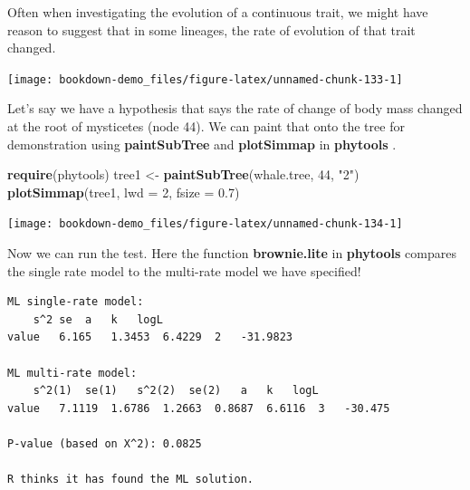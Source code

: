 \documentclass[
]{book}
\newenvironment{Shaded}{\begin{snugshade}}{\end{snugshade}}
\newcommand{\DataTypeTok}[1]{\textcolor[rgb]{0.13,0.29,0.53}{#1}}
\newcommand{\DecValTok}[1]{\textcolor[rgb]{0.00,0.00,0.81}{#1}}
\newcommand{\FloatTok}[1]{\textcolor[rgb]{0.00,0.00,0.81}{#1}}
\newcommand{\KeywordTok}[1]{\textcolor[rgb]{0.13,0.29,0.53}{\textbf{#1}}}
\newcommand{\NormalTok}[1]{#1}
\newcommand{\OperatorTok}[1]{\textcolor[rgb]{0.81,0.36,0.00}{\textbf{#1}}}
\newcommand{\StringTok}[1]{\textcolor[rgb]{0.31,0.60,0.02}{#1}}
\begin{document}
Often when investigating the evolution of a continuous trait, we might have reason to suggest that in some lineages, the rate of evolution of that trait changed.

\begin{center}\texttt{[image: bookdown-demo\_files/figure-latex/unnamed-chunk-133-1]} \end{center}

Let's say we have a hypothesis that says the rate of change of body mass changed at the root of mysticetes (node 44). We can paint that onto the tree for demonstration using \textbf{paintSubTree} and \textbf{plotSimmap} in \textbf{phytools} \citep{phytools}.

\begin{Shaded}
\begin{Highlighting}[]
\KeywordTok{require}\NormalTok{(phytools)}
\NormalTok{tree1 \textless{}{-}}\StringTok{ }\KeywordTok{paintSubTree}\NormalTok{(whale.tree, }\DecValTok{44}\NormalTok{, }\StringTok{"2"}\NormalTok{)}
\KeywordTok{plotSimmap}\NormalTok{(tree1, }\DataTypeTok{lwd =} \DecValTok{2}\NormalTok{, }\DataTypeTok{fsize =} \FloatTok{0.7}\NormalTok{)}
\end{Highlighting}
\end{Shaded}

\begin{center}\texttt{[image: bookdown-demo\_files/figure-latex/unnamed-chunk-134-1]} \end{center}

Now we can run the test. Here the function \textbf{brownie.lite} in \textbf{phytools} compares the single rate model to the multi-rate model we have specified!

\begin{Shaded}
\end{Shaded}

\begin{verbatim}
ML single-rate model:
    s^2 se  a   k   logL
value   6.165   1.3453  6.4229  2   -31.9823    

ML multi-rate model:
    s^2(1)  se(1)   s^2(2)  se(2)   a   k   logL    
value   7.1119  1.6786  1.2663  0.8687  6.6116  3   -30.475

P-value (based on X^2): 0.0825 

R thinks it has found the ML solution.
\end{verbatim}
\end{document}
